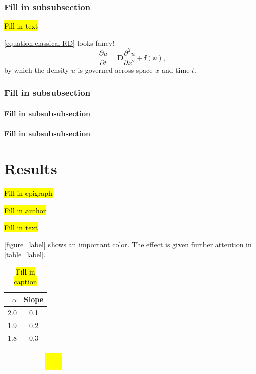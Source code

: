 \documentclass[oneside]{book}
\begin{document}
\subsection{Fill in subsubsection}

\hl{Fill in text}

\autoref{equation:classical RD} looks fancy!
\begin{equation}
\label{equation:classical RD}
\dfrac{\partial u}{\partial t} = \mathbf{D}\dfrac{\partial ^2 u}{\partial x^2} + \mathbf{f}(u),
\end{equation}
by which the density $u$ is governed across space $x$ and time $t$.

\subsection{Fill in subsubsection}
\subsubsection{Fill in subsubsubsection}
\subsubsection{Fill in subsubsubsection}

\chaptercloser

\chapter{Results}
\label{chap:results}

\label{chap:introduction}
\epigraph{\hl{Fill in epigraph}}{\hl{Fill in author}}

\hl{Fill in text}

\autoref{figure_label} shows an important color.
The effect is given further attention in \autoref{table_label}.

\begin{table}
\centering
\caption{\hl{Fill in caption}}
\bgroup
\def\arraystretch{1.5}
\begin{tabular}{r|c}
$\alpha$	& Slope	\\
\hline
2.0 & 0.1 \\
1.9 & 0.2 \\
1.8 & 0.3 \\
\end{tabular}
\egroup
\label{table_label}
\end{table}

\begin{figure}
\centering
\caption{
\hl{Fill in caption}
}
\begin{subfigure}{1.0\textwidth}
\centering
\includegraphics[clip, trim = 0.5cm 0.5cm 0.5cm 0.5cm, width = 0.1\textwidth]{image.png}
\end{subfigure}
\label{figure_label}
\end{figure}
\end{document}
